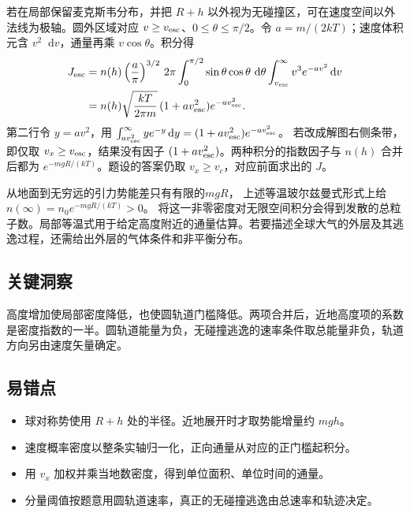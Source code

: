 \documentclass[UTF8,fontset=fandol,a4paper,11pt]{ctexart}
\newcommand{\dd}{\mathop{}\!\mathrm{d}}
\begin{document}
若在局部保留麦克斯韦分布，并把 $R+h$ 以外视为无碰撞区，可在速度空间以外法线为极轴。圆外区域对应 $v\ge v_{\rm esc}$、$0\le\theta\le\pi/2$。令 $a=m/(2kT)$；速度体积元含 $v^2\dd v$，通量再乘 $v\cos\theta$。积分得
\[
\begin{aligned}
J_{\rm esc}
&=n(h)\left(\frac a\pi\right)^{3/2}
\,2\pi\int_0^{\pi/2}\sin\theta\cos\theta\,\dd\theta
\int_{v_{\rm esc}}^\infty v^3e^{-av^2}\dd v\\
&=n(h)\sqrt{\frac{kT}{2\pi m}}\,
    (1+a v_{\rm esc}^2)e^{-a v_{\rm esc}^2}.
\end{aligned}
\]
第二行令 $y=av^2$，用
$\int_{av_{\rm esc}^2}^\infty ye^{-y}\dd y=(1+av_{\rm esc}^2)e^{-av_{\rm esc}^2}$。
若改成解图右侧条带，即仅取 $v_x\ge v_{\rm esc}$，结果没有因子 $(1+a v_{\rm esc}^2)$。两种积分的指数因子与 $n(h)$ 合并后都为 $e^{-mgR/(kT)}$。题设的答案仍取 $v_x\ge v_c$，对应前面求出的 $J$。

从地面到无穷远的引力势能差只有有限的$mgR$，
上述等温玻尔兹曼式形式上给$n(\infty)=n_0e^{-mgR/(kT)}>0$。
将这一非零密度对无限空间积分会得到发散的总粒子数。局部等温式用于给定高度附近的通量估算。若要描述全球大气的外层及其逃逸过程，还需给出外层的气体条件和非平衡分布。




\subsection*{关键洞察}

高度增加使局部密度降低，也使圆轨道门槛降低。两项合并后，近地高度项的系数是密度指数的一半。圆轨道能量为负，无碰撞逃逸的速率条件取总能量非负，轨道方向另由速度矢量确定。



\subsection*{易错点}

\begin{itemize}
\item 球对称势使用 $R+h$ 处的半径。近地展开时才取势能增量约 $mgh$。
\item 速度概率密度以整条实轴归一化，正向通量从对应的正门槛起积分。
\item 用 $v_x$ 加权并乘当地数密度，得到单位面积、单位时间的通量。
\item 分量阈值按题意用圆轨道速率，真正的无碰撞逃逸由总速率和轨迹决定。
\end{itemize}
\end{document}
